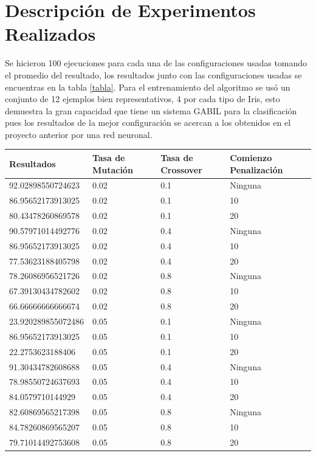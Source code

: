 \documentclass[a4paper,10pt]{article}
\begin{document}
\section{Descripción de Experimentos Realizados}

\indent Se hicieron 100 ejecuciones para cada una de las configuraciones usadas tomando
el promedio del resultado, los resultados junto con las configuraciones 
usadas se encuentras en la tabla \ref{tabla}. Para el entrenamiento del algoritmo
se usó un conjunto de 12 ejemplos bien representativos, 4 por cada tipo de Iris, esto
demuestra la gran capacidad que tiene un sistema GABIL para la clasificación pues
los resultados de la mejor configuración se acercan a los obtenidos en el proyecto
anterior por una red neuronal.

\begin{table}[!hbtp]
\begin{tabular}{|l|p{2.4cm}|p{2.4cm}|p{2.4cm}|}
\hline
Resultados & Tasa de Mutación & Tasa de Crossover & Comienzo Penalización \\
\hline
92.02898550724623 & 0.02 & 0.1 & Ninguna \\
\hline
86.95652173913025 & 0.02 & 0.1 & 10 \\
\hline
80.43478260869578 & 0.02 & 0.1 & 20 \\
\hline
90.57971014492776 & 0.02 & 0.4 & Ninguna \\
\hline
86.95652173913025 & 0.02 & 0.4 & 10 \\
\hline
77.53623188405798 & 0.02 & 0.4 & 20 \\
\hline
78.26086956521726 & 0.02 & 0.8 & Ninguna \\
\hline
67.39130434782602 & 0.02 & 0.8 & 10 \\
\hline
66.66666666666674 & 0.02 & 0.8 & 20 \\
\hline
23.920289855072486 & 0.05 & 0.1 & Ninguna \\
\hline
86.95652173913025 & 0.05 & 0.1 & 10 \\
\hline
22.2753623188406 & 0.05 & 0.1 & 20 \\
\hline
91.30434782608688 & 0.05 & 0.4 & Ninguna \\
\hline
78.98550724637693 & 0.05 & 0.4 & 10 \\
\hline
84.0579710144929 & 0.05 & 0.4 & 20 \\
\hline
82.60869565217398 & 0.05 & 0.8 & Ninguna \\
\hline
84.78260869565207 & 0.05 & 0.8 & 10 \\
\hline
79.71014492753608 & 0.05 & 0.8 & 20 \\

\end{tabular}
\end{table}
\end{document}
